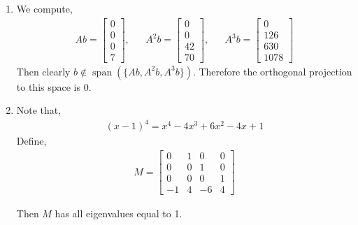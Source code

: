 \documentclass[10pt]{article}
\begin{document}
\begin{solution}[Solution]
\begin{enumerate}[label=(\alph*)]
    \item We compute,
        \begin{align*}
            Ab = \left[\begin{array}{c}0\\0\\0\\7\end{array}\right] 
            ,&&
            A^2b = \left[\begin{array}{c}0\\0\\42\\70\end{array}\right] 
            ,&&
            A^3b = \left[\begin{array}{c}0\\126\\630\\1078\end{array}\right] 
        \end{align*}
        Then clearly \( b\notin \operatorname{span}(\{Ab,A^2b,A^3b\}) \). Therefore the orthogonal projection to this space is \( 0 \).
    \item
        Note that,
        \begin{align*}
            (x-1)^4 = x^4-4x^3+6x^2-4x+1
        \end{align*}
        Define,
        \begin{align*}
            M = \left[\begin{array}{rrrr}0 & 1 & 0 & 0 \\ 0&0&1&0\\0&0&0&1\\-1&4&-6&4\end{array}\right]
        \end{align*}
        
        Then \( M \) has all eigenvalues equal to 1.
        

\end{enumerate}
\end{solution}
\end{document}

